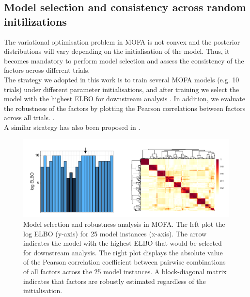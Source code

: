 \subsection{Model selection and consistency across random initilizations} \label{section:mofa_robustness}
The variational optimisation problem in MOFA is not convex and the posterior distributions will vary depending on the initialisation of the model. Thus, it becomes mandatory to perform model selection and assess the consistency of the factors across different trials.\\
The strategy we adopted in this work is to train several MOFA models (e.g. 10 trials) under different parameter initialisations, and after training we select the model with the highest ELBO for downstream analysis . In addition, we evaluate the robustness of the factors by plotting the Pearson correlations between factors across all trials. .\\
A similar strategy has also been proposed in \cite{Hore2016,Hore2015-thesis}.


\begin{figure}[H]
	\centering 	
	\includegraphics[width=1.0\textwidth]{MOFA_robustness}
	\caption{ Model selection and robustness analysis in MOFA. The left plot the log ELBO (y-axis) for 25 model instances (x-axis).
	The arrow indicates the model with the highest ELBO that would be selected for downstream analysis. The right plot displays the absolute value of the Pearson correlation coefficient between pairwise combinations of all factors across the 25 model instances. A block-diagonal matrix indicates that factors are robustly estimated regardless of the initialisation.}
	\label{fig:MOFA_robustness}
\end{figure}




